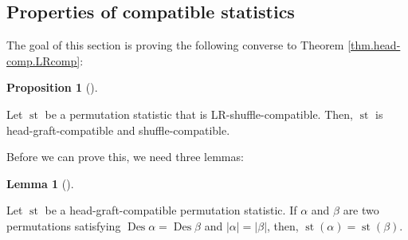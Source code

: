 \documentclass[numbers=enddot,12pt,final,onecolumn,notitlepage]{scrartcl}%
\theoremstyle{definition}
\newtheorem{lem}[theo]{Lemma}
\newenvironment{lemma}[1][]
{\begin{lem}[#1]\begin{leftbar}}
{\end{leftbar}\end{lem}}
\newtheorem{prop}[theo]{Proposition}
\newenvironment{proposition}[1][]
{\begin{prop}[#1]\begin{leftbar}}
{\end{leftbar}\end{prop}}
\begin{document}
\subsection{Properties of compatible statistics}

The goal of this section is proving the following converse to Theorem
\ref{thm.head-comp.LRcomp}:

\begin{proposition}
\label{prop.LRcomp.head}Let $\operatorname*{st}$ be a permutation statistic
that is LR-shuffle-compatible. Then, $\operatorname*{st}$ is
head-graft-compatible and shuffle-compatible.
\end{proposition}

Before we can prove this, we need three lemmas:

\begin{lemma}
\label{lem.LRcomp.head-l1}Let $\operatorname*{st}$ be a head-graft-compatible
permutation statistic. If $\alpha$ and $\beta$ are two permutations satisfying
$\operatorname*{Des}\alpha=\operatorname*{Des}\beta$ and $\left\vert
\alpha\right\vert =\left\vert \beta\right\vert $, then, $\operatorname*{st}%
\left(  \alpha\right)  =\operatorname*{st}\left(  \beta\right)  $.
\end{lemma}
\end{document}
